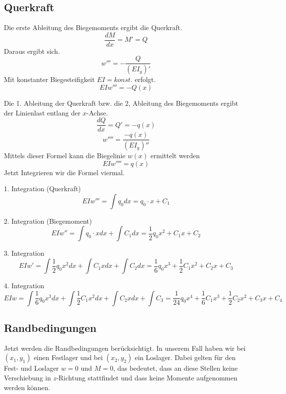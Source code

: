 \subsection{Querkraft}
Die erste Ableitung des Biegemoments ergibt die Querkraft.
\begin{equation}
	\frac{dM}{dx}=
	M'=
	Q
\end{equation}
Daraus ergibt sich.
\begin{equation}
	w'''=
	-\frac{Q}{(EI_y)'}
\end{equation}
Mit konstanter Biegesteifigkeit $EI = konst.$ erfolgt.
\begin{equation}
	EIw'''=
	-Q\left(x\right)
\end{equation}

Die 1. Ableitung der Querkraft bzw. die 2, Ableitung des Biegemoments ergibt der Linienlast entlang der $x$-Achse.
\begin{equation}
	\frac{dQ}{dx}=
	Q'=
	-q(x)
\end{equation}
\begin{equation}
	w''''=
	\frac{-q(x)}{(EI_y)''}
\end{equation}
Mittels dieser Formel kann die Biegelinie $w(x)$ ermittelt werden
\begin{equation}
	EIw''''=
	q\left(x\right) 
\end{equation}
Jetzt Integrieren wir die Formel viermal.

1. Integration (Querkraft)
\begin{equation}
	EIw'''=
	\int q_0dx=
	q_0\cdot x+C_1
\end{equation}

2. Integration (Biegemoment)
\begin{equation}
	EIw''=
	\int{q_0\cdot x}dx+\int C_1dx=
	\frac{1}{2}q_0x^2+C_1x+C_2
\end{equation}

3. Integration
\begin{equation}
	EIw'=
	\int{\frac{1}{2}q_0x^2}dx+\int{C_1x}dx+\int C_2dx=
	\frac{1}{6}q_0x^3+\frac{1}{2}C_1x^2+C_2x+C_3
\end{equation}

4. Integration
\begin{equation}
	EIw=
	\int{\frac{1}{6}q_0x^3}dx+\int{\frac{1}{2}C_1x^2}dx+\int{C_2x}dx+\int C_3=
	\frac{1}{24}q_0x^4+\frac{1}{6}C_1x^3+\frac{1}{2}C_2x^2+C_3x+C_4
\end{equation}

\subsection{Randbedingungen}
Jetzt werden die Randbedingungen berücksichtigt.
In unserem Fall haben wir bei $(x_1, y_1)$ einen Festlager und bei $(x_2, y_2)$ ein Loslager.
Dabei gelten für den Fest- und Loslager $w = 0$ und $M = 0$, das bedeutet, dass an diese Stellen keine Verschiebung in $z$-Richtung stattfindet und dass keine Momente aufgenommen werden können.


